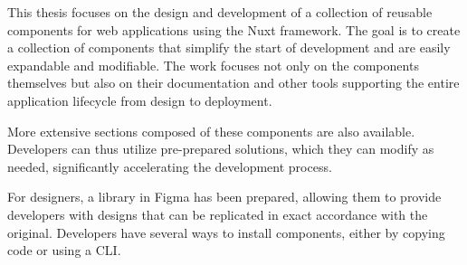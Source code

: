 
This thesis focuses on the design and development of a collection of reusable components for web applications using the Nuxt framework. The goal is to create a collection of components that simplify the start of development and are easily expandable and modifiable. The work focuses not only on the components themselves but also on their documentation and other tools supporting the entire application lifecycle from design to deployment.

More extensive sections composed of these components are also available. Developers can thus utilize pre-prepared solutions, which they can modify as needed, significantly accelerating the development process.

For designers, a library in Figma has been prepared, allowing them to provide developers with designs that can be replicated in exact accordance with the original. Developers have several ways to install components, either by copying code or using a CLI.
